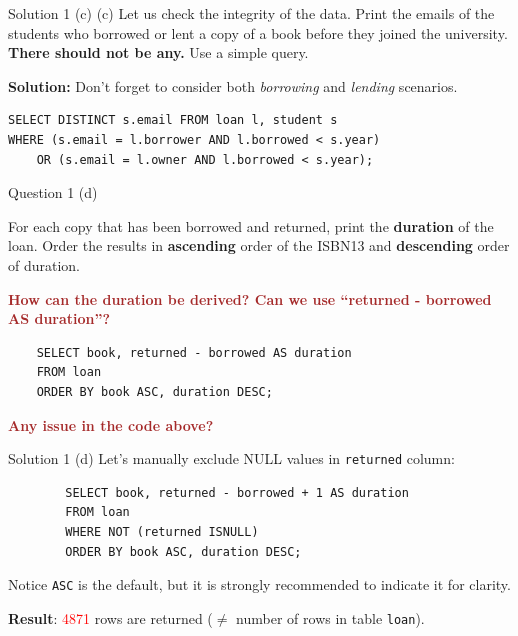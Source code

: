 \begin{frame}[fragile]{Solution 1 (c)}
(c) Let us check the integrity of the data. Print the emails of the students who borrowed or lent a copy of a book before they joined the university. \textbf{There should not be any.} Use a simple query.\\\vspace{10pt}

\textbf{Solution:} Don't forget to consider both \textit{borrowing} and \textit{lending} scenarios.\\

\begin{lstlisting}
SELECT DISTINCT s.email FROM loan l, student s 
WHERE (s.email = l.borrower AND l.borrowed < s.year) 
	OR (s.email = l.owner AND l.borrowed < s.year);
\end{lstlisting}
\end{frame}


\begin{frame}[fragile]{Question 1 (d)}

For each copy that has been borrowed and returned, print the \textbf{duration} of the loan. Order the results in \textbf{ascending} order of the ISBN13 and \textbf{descending} order of duration.  \\ \vspace{15pt}

\textcolor{brown}{\textbf{How can the duration be derived? Can we use ``returned - borrowed AS duration''?}}\\ \vspace{5pt}

\begin{lstlisting}
	SELECT book, returned - borrowed AS duration 
	FROM loan
	ORDER BY book ASC, duration DESC;
\end{lstlisting}

\textcolor{brown}{\textbf{Any issue in the code above?}}
\end{frame}

\begin{frame}[fragile]{Solution 1 (d)}
	Let's manually exclude NULL values in \texttt{returned} column:\\
	\begin{lstlisting}
		SELECT book, returned - borrowed + 1 AS duration 
		FROM loan
		WHERE NOT (returned ISNULL)
		ORDER BY book ASC, duration DESC;
	\end{lstlisting}

\begin{block}{Notice}
\texttt{ASC} is the default, but it is strongly recommended to indicate it for clarity.
\end{block}	

\textbf{Result}: \textcolor{red}{4871} rows are returned ($\neq$ number of rows in table \texttt{loan}).

\end{frame}

